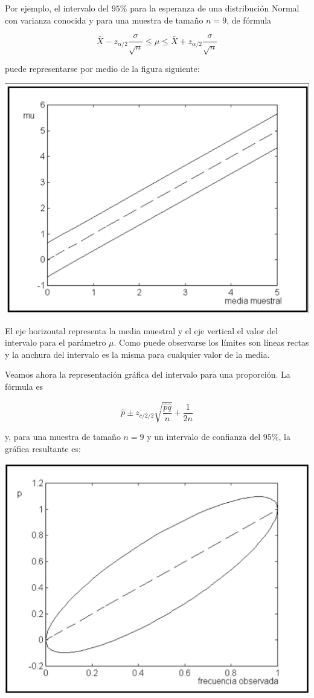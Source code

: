 \documentclass[
]{article}
\begin{document}
Por ejemplo, el intervalo del \(95 \%\) para la esperanza de una distribución Normal con varianza conocida y para una muestra de tamaño \(n=9\), de fórmula

\[
\bar{X}-z_{\alpha / 2} \frac{\sigma}{\sqrt{n}} \leq \mu \leq \bar{X}+z_{\alpha / 2} \frac{\sigma}{\sqrt{n}}
\]

puede representarse por medio de la figura siguiente:

\begin{center}\includegraphics[width=0.8\linewidth]{images/interpretacionGeometrica} \end{center}

El eje horizontal representa la media muestral y el eje vertical el valor del intervalo para el parámetro \(\mu\). Como puede observarse los límites son líneas rectas y la anchura del intervalo es la misma para cualquier valor de la media.

Veamos ahora la representación gráfica del intervalo para una proporción. La fórmula es

\[
\hat{p} \pm z_{c / 2 / 2} \sqrt{\frac{\hat{p} \hat{q}}{n}}+\frac{1}{2 n}
\]

y, para una muestra de tamaño \(n=9\) y un intervalo de confianza del \(95 \%\), la gráfica resultante es:

\begin{center}\includegraphics[width=0.8\linewidth]{images/freqVsprop} \end{center}
\end{document}
